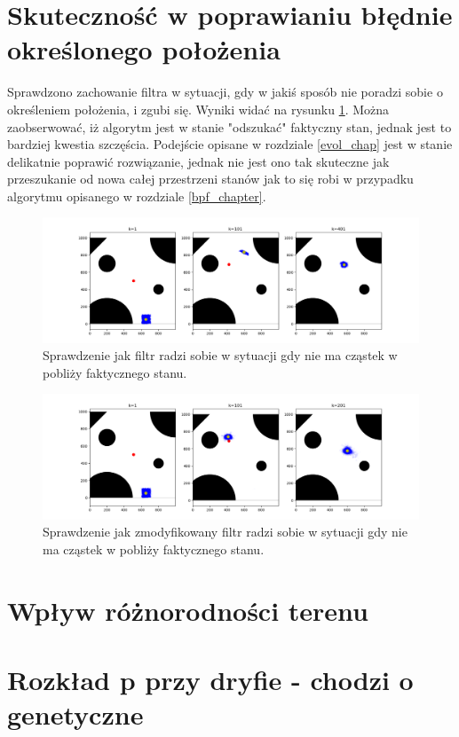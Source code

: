\section{Skuteczność w poprawianiu błędnie określonego położenia}
Sprawdzono zachowanie filtra w sytuacji, gdy w jakiś sposób nie poradzi sobie o określeniem położenia, i zgubi się. Wyniki widać na rysunku \ref{lost}. Można zaobserwować, iż algorytm jest w stanie "odszukać" faktyczny stan, jednak jest to bardziej kwestia szczęścia. Podejście opisane w rozdziale \ref{evol_chap} jest w stanie delikatnie poprawić rozwiązanie, jednak nie jest ono tak skuteczne jak przeszukanie od nowa całej przestrzeni stanów jak to się robi w przypadku algorytmu opisanego w rozdziale \ref{bpf_chapter}.
\begin{figure}[H]
	\begin{center}
		\includegraphics[width=15cm]{./lost.png}
		\caption{Sprawdzenie jak filtr radzi sobie w sytuacji gdy nie ma cząstek w pobliży faktycznego stanu.}
		\label{lost}
	\end{center}
\end{figure}
\begin{figure}[H]
\begin{center}
	\includegraphics[width=15cm]{./lost_evol.png}
	\caption{Sprawdzenie jak zmodyfikowany filtr radzi sobie w sytuacji gdy nie ma cząstek w pobliży faktycznego stanu.}
	\label{lost_evol}
\end{center}
\end{figure}
\section{Wpływ różnorodności terenu}
\section{Rozkład p przy dryfie - chodzi o genetyczne}

